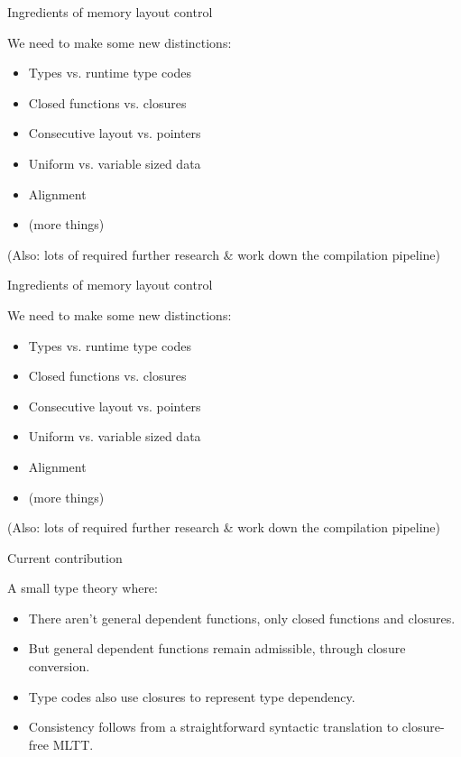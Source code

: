 \documentclass{beamer}
\begin{document}
\begin{frame}{Ingredients of memory layout control}

  We need to make some new distinctions:

  \begin{itemize}
  \item Types vs. runtime type codes
  \item Closed functions vs. closures
  \item Consecutive layout vs. pointers
  \item Uniform vs. variable sized data
  \item Alignment
  \item (more things)
  \end{itemize}
(Also: lots of required further research \& work down the compilation pipeline)
\end{frame}

\begin{frame}{Ingredients of memory layout control}

  We need to make some new distinctions:

  \begin{itemize}
  \item {\color{red} Types vs. runtime type codes}
  \item {\color{red} Closed functions vs. closures}
  \item Consecutive layout vs. pointers
  \item Uniform vs. variable sized data
  \item Alignment
  \item (more things)
  \end{itemize}
(Also: lots of required further research \& work down the compilation pipeline)
\end{frame}

\begin{frame}{Current contribution}

  A small type theory where:
  \begin{itemize}
  \item There aren't general dependent functions, only closed functions and closures.
  \item But general dependent functions remain admissible, through closure conversion.
  \item Type codes also use closures to represent type dependency.
  \item Consistency follows from a straightforward syntactic translation to closure-free
        MLTT.
  \end{itemize}
\end{frame}
\end{document}
